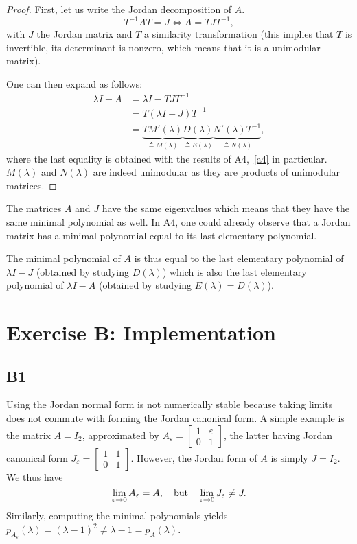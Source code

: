 \documentclass[11pt]{article}
\begin{document}
\begin{proof}
First, let us write the Jordan decomposition of \(A\).
\[
T^{-1} A T =J \iff A= T J T^{-1},
\]
with $J$ the Jordan matrix and $T$ a similarity transformation (this implies that $T$ is invertible, its determinant is nonzero, which means that it is a unimodular matrix).

One can then expand as follows:
\begin{align*}
\lambda I - A &= \lambda I - T J T^{-1}\\
&= T(\lambda I - J) T^{-1}\\
&= \underbrace{TM'(\lambda)}_{\triangleq M(\lambda)}\underbrace{D(\lambda)}_{\triangleq E(\lambda)}\underbrace{N'(\lambda)T^{-1}}_{\triangleq N(\lambda)},
\end{align*}
where the last equality is obtained with the results of A4,~\eqref{a4} in particular.
$M(\lambda)$ and $N(\lambda)$ are indeed unimodular as they are products of unimodular matrices.
\end{proof}

The matrices $A$ and $J$ have the same eigenvalues which means that they have the same minimal polynomial as well.
In A4, one could already observe that a Jordan matrix has a minimal polynomial equal to its last elementary polynomial.

The minimal polynomial of $A$ is thus equal to the last elementary polynomial of $\lambda I - J$ (obtained by studying $D(\lambda)$) which is also the last elementary polynomial of $\lambda I - A$ (obtained by studying $E(\lambda) = D(\lambda)$).

\section*{Exercise B: Implementation}
\subsection*{B1}
Using the Jordan normal form is not numerically stable because taking limits does not commute with forming the Jordan canonical form.
A simple example is the matrix \(A = I_2\), approximated by \(A_\varepsilon = \left[\begin{smallmatrix} 1 & \varepsilon \\ 0 & 1\end{smallmatrix}\right]\), the latter having Jordan canonical form \(J_\varepsilon = \left[\begin{smallmatrix} 1 & 1 \\ 0 & 1\end{smallmatrix}\right]\).
However, the Jordan form of \(A\) is simply \(J = I_2\).
We thus have
\[
\lim_{\varepsilon \to 0} A_\varepsilon = A, \quad \textnormal{but} \quad \lim_{\varepsilon \to 0} J_\varepsilon \neq J.
\]
Similarly, computing the minimal polynomials yields \(p_{A_\varepsilon}(\lambda) = (\lambda - 1)^2 \ne \lambda - 1 = p_A(\lambda)\).
\end{document}
